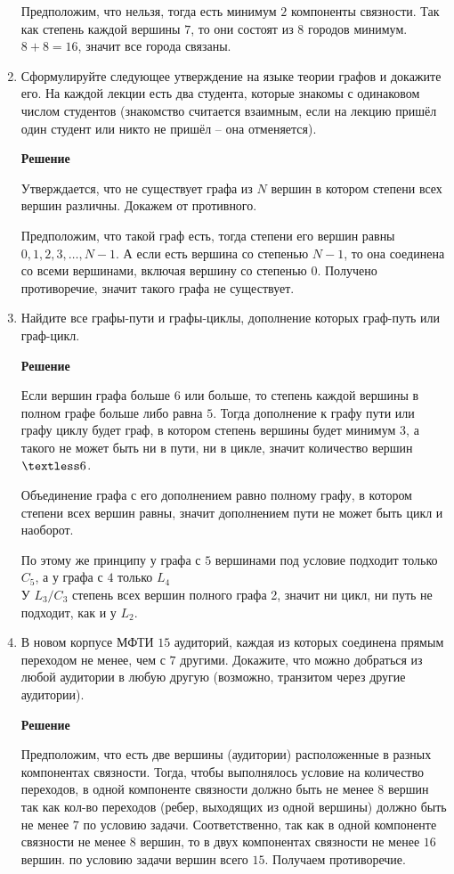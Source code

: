 \documentclass[12pt]{article}
\begin{document}
\begin{enumerate}[label={\textbf{\arabic{section}.\arabic*}}]
		Предположим, что нельзя, тогда есть минимум $2$ компоненты связности. Так как степень каждой вершины $7$, то они состоят из $8$ городов минимум. $8+8 = 16$, значит все города связаны.
		
		\item Сформулируйте следующее утверждение на языке теории графов и докажите его. На каждой лекции есть два студента, которые знакомы с одинаковом числом студентов (знакомство считается взаимным, если на лекцию пришёл один студент или никто не пришёл -- она отменяется).
		
		\textbf{Решение}
		
		Утверждается, что не существует графа из $N$ вершин в котором степени всех вершин различны. Докажем от противного.
		
		Предположим, что такой граф есть, тогда степени его вершин равны $0,1,2,3,\dots,N-1$. А если есть вершина со степенью $N-1$, то она соединена со всеми вершинами, включая вершину со степенью $0$. Получено противоречие, значит такого графа не существует.
		
		\item Найдите все графы-пути и графы-циклы, дополнение которых граф-путь или граф-цикл.
		
		\textbf{Решение}
		
		Если вершин графа больше $6$ или больше, то степень каждой вершины в полном графе больше либо равна $5$. Тогда дополнение к графу пути или графу циклу будет граф, в котором степень вершины будет минимум $3$, а такого не может быть ни в пути, ни в цикле, значит количество вершин $\textless 6$.
		
		Объединение графа с его дополнением равно полному графу, в котором степени всех вершин равны, значит дополнением пути не может быть цикл и наоборот. 
		
		По этому же принципу у графа с $5$ вершинами под условие подходит только $C_5$, а у графа с $4$ только $L_4$\\
		У $L_3/C_3$ степень всех вершин полного графа 2, значит ни цикл, ни путь не подходит, как и у $L_2$.
		
		\item В новом корпусе МФТИ $15$ аудиторий, каждая из которых соединена прямым переходом не менее, чем с $7$ другими. Докажите, что можно добраться из любой аудитории в любую другую (возможно, транзитом через другие аудитории).

		
		\textbf{Решение}
		
		Предположим, что есть две вершины (аудитории) расположенные в разных компонентах связности. Тогда, чтобы выполнялось условие на количество переходов, в одной компоненте связности должно быть не менее $8$ вершин так как кол-во переходов (ребер, выходящих из одной вершины) должно быть не менее $7$ по условию задачи. Соответственно, так как в одной компоненте связности не менее $8$ вершин, то в двух компонентах связности не менее $16$ вершин. по условию задачи вершин всего $15$. Получаем противоречие.
	\end{enumerate}
	\newpage
\end{document}
